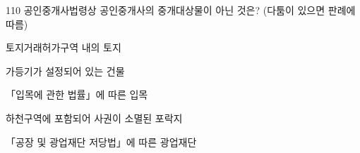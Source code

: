 \begin{question}{110}
공인중개사법령상 공인중개사의 중개대상물이 아닌 것은? (다툼이 있으면 판례에 따름)
\begin{choices}
  \item 토지거래허가구역 내의 토지
  \item 가등기가 설정되어 있는 건물
  \item 「입목에 관한 법률」에 따른 입목
  \item 하천구역에 포함되어 사권이 소멸된 포락지
  \item 「공장 및 광업재단 저당법」에 따른 광업재단
\end{choices}
\end{question}
